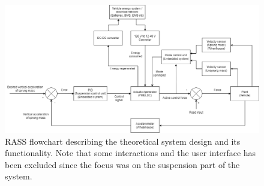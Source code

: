 \begin{figure}
    \centering
    \includegraphics[width=\columnwidth]{images/RASS_flowchart.png}
    \caption{RASS flowchart describing the theoretical system design and its functionality. Note that some interactions and the user interface has been excluded since the focus was on the suspension part of the system.}
    \label{fig:RASS_flowchart}
\end{figure}

